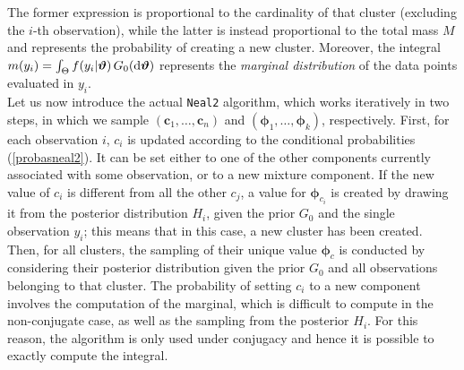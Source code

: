The former expression is proportional to the cardinality of that cluster (excluding the $i$-th observation), while the latter is instead proportional to the total mass $M$ and represents the probability of creating a new cluster.
Moreover, the integral $m(y_i) = \int_{\Theta} f(y_{i}|\boldsymbol{\vartheta}) \, G_0(\mathrm d\boldsymbol{\vartheta})$ represents the \emph{marginal distribution} of the data points evaluated in $y_i$. \\
Let us now introduce the actual \verb|Neal2| algorithm, which works iteratively in two steps, in which we sample $(\boldsymbol{c}_1,\dots,\boldsymbol{c}_n)$ and $(\boldsymbol{\phi}_1,\dots,\boldsymbol{\phi}_k)$, respectively.
First, for each observation $i$, $c_i$ is updated according to the conditional probabilities (\ref{probasneal2}).
It can be set either to one of the other components currently associated with some observation, or to a new mixture component.
If the new value of $c_i$ is different from all the other $c_j$, a value for $\boldsymbol\phi_{c_i}$ is created by drawing it from the posterior distribution $H_i$, given the prior $G_0$ and the single observation $y_i$; this means that in this case, a new cluster has been created. \\
Then, for all clusters, the sampling of their unique value $\boldsymbol\phi_c$ is conducted by considering their posterior distribution given the prior $G_0$ and all observations belonging to that cluster.
The probability of setting $c_i$ to a new component involves the computation of the marginal, which is difficult to compute in the non-conjugate case, as well as the sampling from the posterior $H_i$.
For this reason, the algorithm is only used under conjugacy and hence it is possible to exactly compute the integral.

